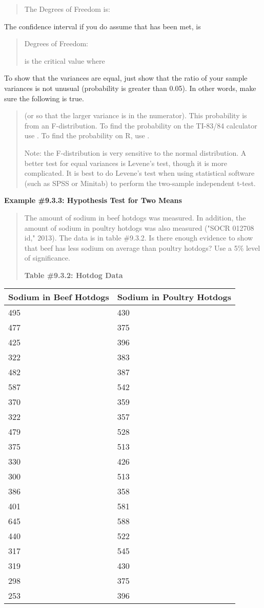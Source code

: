 \documentclass[]{book}
\begin{document}
\begin{quote}
The Degrees of Freedom is:
\end{quote}

The confidence interval if you do assume that has been met, is

\begin{quote}
Degrees of Freedom:

is the critical value where
\end{quote}

To show that the variances are equal, just show that the ratio of your sample variances is not unusual (probability is greater than 0.05). In other words, make sure the following is true.

\begin{quote}
(or so that the larger variance is in the numerator). This probability is from an F-distribution. To find the probability on the TI-83/84 calculator use . To find the probability on R, use .

Note: the F-distribution is very sensitive to the normal distribution. A better test for equal variances is Levene's test, though it is more complicated. It is best to do Levene's test when using statistical software (such as SPSS or Minitab) to perform the two-sample independent t-test.
\end{quote}

\textbf{Example \#9.3.3: Hypothesis Test for Two Means}

\begin{quote}
The amount of sodium in beef hotdogs was measured. In addition, the amount of sodium in poultry hotdogs was also measured ("SOCR 012708 id," 2013). The data is in table \#9.3.2. Is there enough evidence to show that beef has less sodium on average than poultry hotdogs? Use a 5\% level of significance.

\textbf{Table \#9.3.2: Hotdog Data}
\end{quote}

\begin{longtable}[]{@{}ll@{}}
\toprule
Sodium in Beef Hotdogs & Sodium in Poultry Hotdogs\tabularnewline
\midrule
\endhead
495 & 430\tabularnewline
477 & 375\tabularnewline
425 & 396\tabularnewline
322 & 383\tabularnewline
482 & 387\tabularnewline
587 & 542\tabularnewline
370 & 359\tabularnewline
322 & 357\tabularnewline
479 & 528\tabularnewline
375 & 513\tabularnewline
330 & 426\tabularnewline
300 & 513\tabularnewline
386 & 358\tabularnewline
401 & 581\tabularnewline
645 & 588\tabularnewline
440 & 522\tabularnewline
317 & 545\tabularnewline
319 & 430\tabularnewline
298 & 375\tabularnewline
253 & 396\tabularnewline
\bottomrule
\end{longtable}
\end{document}
